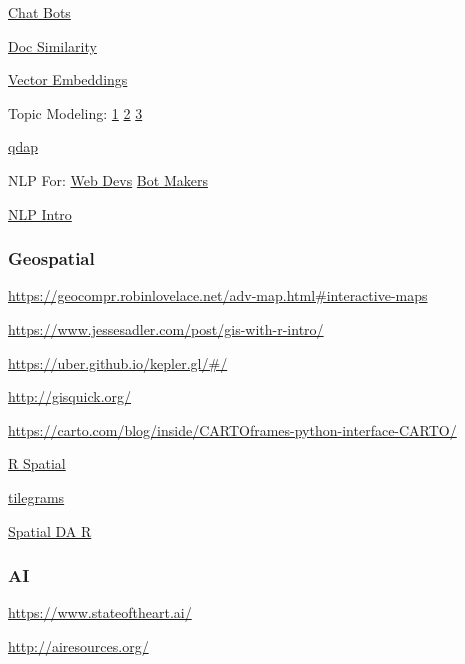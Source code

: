 \documentclass[]{book}
\begin{document}
\href{https://rasa.ai/}{Chat Bots}

\href{http://brandonrose.org/clustering}{Doc Similarity}

\href{http://bookworm.benschmidt.org/posts/2015-10-25-Word-Embeddings.html}{Vector Embeddings}

Topic Modeling: \href{http://alexperrier.github.io/jekyll/update/2015/09/04/topic-modeling-of-twitter-followers.html}{1} \textbar{} \href{http://chdoig.github.io/pytexas2015-topic-modeling/\#/}{2} \textbar{} \href{https://www.cs.princeton.edu/~blei/topicmodeling.html}{3}

\href{https://trinker.github.io/qdap/vignettes/qdap_vignette.html}{qdap}

NLP For: \href{http://blog.algorithmia.com/natural-language-processing-algorithms-web-developers/}{Web Devs} \textbar{} \href{https://stanfy.com/blog/advanced-natural-language-processing-tools-for-bot-makers/}{Bot Makers}

\href{http://blog.algorithmia.com/introduction-natural-language-processing-nlp/}{NLP Intro}

\hypertarget{geospatial}{%
\subsubsection{Geospatial}\label{geospatial}}

\url{https://geocompr.robinlovelace.net/adv-map.html\#interactive-maps}

\url{https://www.jessesadler.com/post/gis-with-r-intro/}

\url{https://uber.github.io/kepler.gl/\#/}

\url{http://gisquick.org/}

\url{https://carto.com/blog/inside/CARTOframes-python-interface-CARTO/}

\href{http://www.rspatial.org/analysis/rst/2-scale_distance.html}{R Spatial}

\href{https://pitchinteractiveinc.github.io/tilegrams/}{tilegrams}

\href{https://data.cdrc.ac.uk/tutorial/an-introduction-to-spatial-data-analysis-and-visualisation-in-r}{Spatial DA R}

\hypertarget{ai}{%
\subsubsection{AI}\label{ai}}

\url{https://www.stateoftheart.ai/}

\url{http://airesources.org/}
\end{document}
